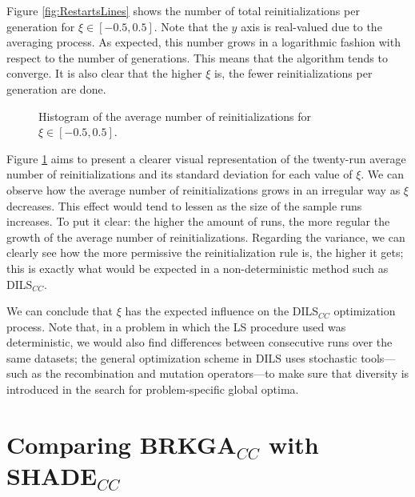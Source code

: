 Figure \ref{fig:RestartsLines} shows the number of total reinitializations per generation for $\xi \in [-0.5,0.5]$. Note that the $y$ axis is real-valued due to the averaging process. As expected, this number grows in a logarithmic fashion with respect to the number of generations. This means that the algorithm tends to converge. It is also clear that the higher $\xi$ is, the fewer reinitializations per generation are done.


\begin{figure}[bth]
	\myfloatalign
	\hspace{1cm}
	\caption{Histogram of the average number of reinitializations for $\xi \in [-0.5,0.5]$.}
	\label{fig:RestartsHist}
\end{figure}

Figure \ref{fig:RestartsHist} aims to present a clearer visual representation of the twenty-run average number of reinitializations and its standard deviation for each value of $\xi$. We can observe how the average number of reinitializations grows in an irregular way as $\xi$ decreases. This effect would tend to lessen as the size of the sample runs increases. To put it clear: the higher the amount of runs, the more regular the growth of the average number of reinitializations. Regarding the variance, we can clearly see how the more permissive the reinitialization rule is, the higher it gets; this is exactly what would be expected in a non-deterministic method such as \acs{DILS}$_{CC}$.

We can conclude that $\xi$ has the expected influence on the \acs{DILS}$_{CC}$ optimization process. Note that, in a problem in which the \acs{LS} procedure used was deterministic, we would also find differences between consecutive runs over the same datasets; the general optimization scheme in \acs{DILS} uses stochastic tools---such as the recombination and mutation operators---to make sure that diversity is introduced in the search for problem-specific global optima.

\section[Comparing \acsfont{BRKGA}$_{CC}$ with \acsfont{SHADE}$_{CC}$]{Comparing BRKGA$_{CC}$ with SHADE$_{CC}$} \label{sec:BRKGAvsSHADE}

